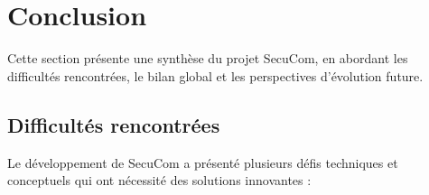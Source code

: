 \chapter*{Conclusion}

Cette section présente une synthèse du projet SecuCom, en abordant les difficultés rencontrées, le bilan global et les perspectives d'évolution future.

\section*{Difficultés rencontrées}

Le développement de SecuCom a présenté plusieurs défis techniques et conceptuels qui ont nécessité des solutions innovantes :

